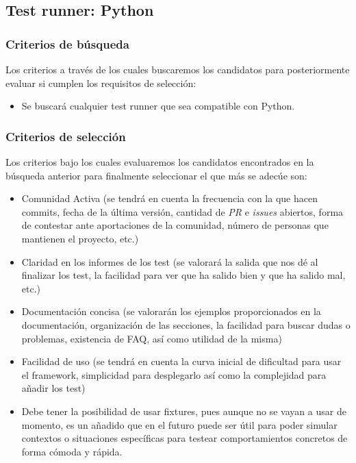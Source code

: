 \subsection{Test runner: Python}

\subsubsection{Criterios de búsqueda}

Los criterios a través de los cuales buscaremos los candidatos para
posteriormente evaluar si cumplen los requisitos de selección:
\begin{itemize}
    \item Se buscará cualquier test runner que sea compatible con Python.
\end{itemize}

\subsubsection{Criterios de selección}

Los criterios bajo los cuales evaluaremos los candidatos encontrados en la
búsqueda anterior para finalmente seleccionar el que más se adecúe son:
\begin{itemize}
    \item Comunidad Activa (se tendrá en cuenta la frecuencia con la que hacen
    commits, fecha de la última versión, cantidad de \emph{PR} e \emph{issues}
    abiertos, forma de contestar ante aportaciones de la comunidad, número de
    personas que mantienen el proyecto, etc.)
    \item Claridad en los informes de los test (se valorará la salida que nos dé
    al finalizar los test, la facilidad para ver que ha salido bien y que ha
    salido mal, etc.)
    \item Documentación concisa (se valorarán los ejemplos proporcionados en la
    documentación, organización de las secciones, la facilidad para buscar dudas
    o problemas, existencia de FAQ, así como utilidad de la misma)
    \item Facilidad de uso (se tendrá en cuenta la curva inicial de dificultad
    para usar el framework, simplicidad para desplegarlo así como la complejidad
    para añadir los test)
    \item Debe tener la posibilidad de usar fixtures, pues aunque no se vayan a
    usar de momento, es un añadido que en el futuro puede ser útil para poder
    simular contextos o situaciones específicas para testear comportamientos
    concretos de forma cómoda y rápida.
\end{itemize}


